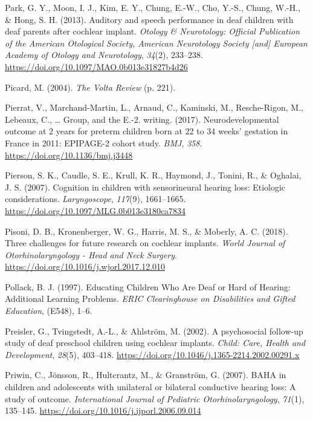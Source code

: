 \documentclass[
  english,
  man]{apa6}
\begin{document}
\leavevmode\hypertarget{ref-park2013}{}%
Park, G. Y., Moon, I. J., Kim, E. Y., Chung, E.-W., Cho, Y.-S., Chung, W.-H., \& Hong, S. H. (2013). Auditory and speech performance in deaf children with deaf parents after cochlear implant. \emph{Otology \& Neurotology: Official Publication of the American Otological Society, American Neurotology Society {[}and{]} European Academy of Otology and Neurotology}, \emph{34}(2), 233--238. \url{https://doi.org/10.1097/MAO.0b013e31827b4d26}

\leavevmode\hypertarget{ref-picard2004}{}%
Picard, M. (2004). \emph{The Volta Review} (p. 221).

\leavevmode\hypertarget{ref-pierrat2017}{}%
Pierrat, V., Marchand-Martin, L., Arnaud, C., Kaminski, M., Resche-Rigon, M., Lebeaux, C., \ldots{} Group, and the E.-2. writing. (2017). Neurodevelopmental outcome at 2 years for preterm children born at 22 to 34 weeks' gestation in France in 2011: EPIPAGE-2 cohort study. \emph{BMJ}, \emph{358}. \url{https://doi.org/10.1136/bmj.j3448}

\leavevmode\hypertarget{ref-pierson2007}{}%
Pierson, S. K., Caudle, S. E., Krull, K. R., Haymond, J., Tonini, R., \& Oghalai, J. S. (2007). Cognition in children with sensorineural hearing loss: Etiologic considerations. \emph{Laryngoscope}, \emph{117}(9), 1661--1665. \url{https://doi.org/10.1097/MLG.0b013e3180ca7834}

\leavevmode\hypertarget{ref-pisoni2018}{}%
Pisoni, D. B., Kronenberger, W. G., Harris, M. S., \& Moberly, A. C. (2018). Three challenges for future research on cochlear implants. \emph{World Journal of Otorhinolaryngology - Head and Neck Surgery}. \url{https://doi.org/10.1016/j.wjorl.2017.12.010}

\leavevmode\hypertarget{ref-pollack1997}{}%
Pollack, B. J. (1997). Educating Children Who Are Deaf or Hard of Hearing: Additional Learning Problems. \emph{ERIC Clearinghouse on Disabilities and Gifted Education}, (E548), 1--6.

\leavevmode\hypertarget{ref-preisler2002}{}%
Preisler, G., Tvingstedt, A.-L., \& Ahlström, M. (2002). A psychosocial follow-up study of deaf preschool children using cochlear implants. \emph{Child: Care, Health and Development}, \emph{28}(5), 403--418. \url{https://doi.org/10.1046/j.1365-2214.2002.00291.x}

\leavevmode\hypertarget{ref-priwin2007}{}%
Priwin, C., Jönsson, R., Hultcrantz, M., \& Granström, G. (2007). BAHA in children and adolescents with unilateral or bilateral conductive hearing loss: A study of outcome. \emph{International Journal of Pediatric Otorhinolaryngology}, \emph{71}(1), 135--145. \url{https://doi.org/10.1016/j.ijporl.2006.09.014}
\end{document}
